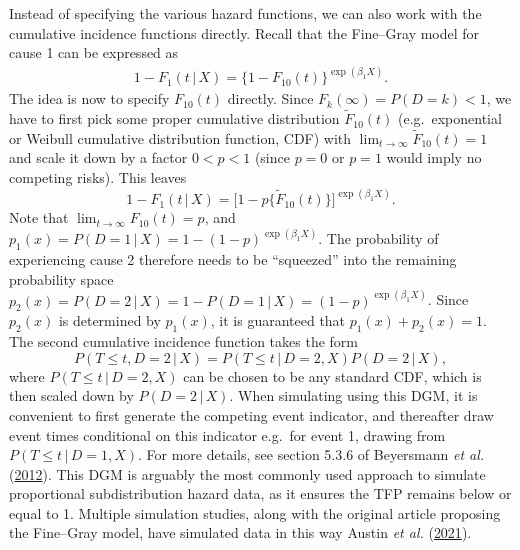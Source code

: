 \documentclass[
  letterpaper,
  DIV=11,
  numbers=noendperiod]{scrreprt}
\newcommand{\given}{\,|\,}
\begin{document}
Instead of specifying the various hazard functions, we can also work
with the cumulative incidence functions directly. Recall that the
Fine--Gray model for cause 1 can be expressed as \begin{align*}
    1 - F_1(t \given X) = \{1 - F_{10}(t)\}^{\exp(\beta_1 X)}.
\end{align*} The idea is now to specify \(F_{10}(t)\) directly. Since
\(F_k(\infty)=P(D=k)<1\), we have to first pick some proper cumulative
distribution \(\tilde{F}_{10}(t)\) (e.g.~exponential or Weibull
cumulative distribution function, CDF) with
\(\lim_{t \to \infty}\tilde{F}_{10}(t) = 1\) and scale it down by a
factor \(0< p < 1\) (since \(p = 0\) or \(p = 1\) would imply no
competing risks). This leaves \begin{equation*}
    1 - F_1(t \given X) = \big[1-p\{ \tilde{F}_{10}(t) \}\big]^{\exp(\beta_1 X)}.
\end{equation*} Note that \(\lim_{t \to \infty}F_{10}(t) = p\), and
\(p_1(x) = P(D = 1 \given X) = 1 - (1-p)^{\exp(\beta_1 X)}\). The
probability of experiencing cause 2 therefore needs to be ``squeezed''
into the remaining probability space
\(p_2(x) = P(D = 2 \given X) = 1 - P(D = 1 \given X) = (1-p)^{\exp(\beta_1 X)}\).
Since \(p_2(x)\) is determined by \(p_1(x)\), it is guaranteed that
\(p_1(x) + p_2(x) = 1\). The second cumulative incidence function takes
the form \begin{equation*}
    P(T \leq t, D=2 \given X) = P(T \leq t \given D=2, X)P(D = 2 \given X),
\end{equation*} where \(P(T \leq t \given D=2, X)\) can be chosen to be
any standard CDF, which is then scaled down by \(P(D = 2 \given X)\).
When simulating using this DGM, it is convenient to first generate the
competing event indicator, and thereafter draw event times conditional
on this indicator e.g.~for event 1, drawing from
\(P(T \leq t \given D=1, X)\). For more details, see section 5.3.6 of
Beyersmann \emph{et al.}
(\protect\hyperlink{ref-beyersmannCompetingRisksMultistate2012}{2012}).
This DGM is arguably the most commonly used approach to simulate
proportional subdistribution hazard data, as it ensures the TFP remains
below or equal to 1. Multiple simulation studies, along with the
original article proposing the Fine--Gray model, have simulated data in
this way Austin \emph{et al.}
(\protect\hyperlink{ref-austinFineGraySubdistributionHazard2021}{2021}).
\end{document}
